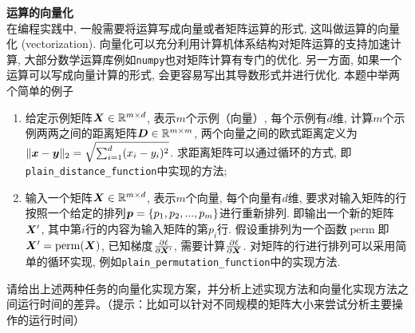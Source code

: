 \documentclass[answers]{exam}  %
\begin{document}
\begin{questions}
\question [20] \textbf{运算的向量化} \\
在编程实践中, 一般需要将运算写成向量或者矩阵运算的形式, 这叫做运算的向量化 (vectorization).
向量化可以充分利用计算机体系结构对矩阵运算的支持加速计算,
大部分数学运算库例如\lstinline{numpy}也对矩阵计算有专门的优化.
另一方面, 如果一个运算可以写成向量计算的形式, 会更容易写出其导数形式并进行优化.
本题中举两个简单的例子
\begin{enumerate}
    \item 给定示例矩阵$\boldsymbol{X} \in \mathbb{R}^{m\times d}$, 表示$m$个示例（向量）, 每个示例有$d$维,
    计算$m$个示例两两之间的距离矩阵$\boldsymbol{D} \in \mathbb{R}^{m\times m}$,
    两个向量之间的欧式距离定义为$\|{\boldsymbol{x}} - \boldsymbol{y}\|_2=\sqrt{\sum_{i=1}^{d} (x_i - y_i)^2}$.
    求距离矩阵可以通过循环的方式, 即\lstinline{plain_distance_function}中实现的方法;
    
    \item 输入一个矩阵$\boldsymbol{X} \in \mathbb{R}^{m\times d}$, 表示$m$个向量, 每个向量有$d$维,
    要求对输入矩阵的行按照一个给定的排列$\boldsymbol{p}=\{p_{1}, p_{2}, ..., p_m\}$进行重新排列.
    即输出一个新的矩阵$\boldsymbol{X}^\prime$, 其中第$i$行的内容为输入矩阵的第$p_{i}$行.
    假设重排列为一个函数$\operatorname{perm}$即$\boldsymbol{X}^\prime = \operatorname{perm}(\boldsymbol{X})$, 已知梯度$\frac{\partial \ell}{\partial \boldsymbol{X}^\prime}$,
    需要计算$\frac{\partial \ell}{\partial \boldsymbol{X}}$. 对矩阵的行进行排列可以采用简单的循环实现, 例如\lstinline{plain_permutation_function}中的实现方法.
    
\end{enumerate}
请给出上述两种任务的向量化实现方案，并分析上述实现方法和向量化实现方法之间运行时间的差异。（提示：比如可以针对不同规模的矩阵大小来尝试分析主要操作的运行时间）


\end{questions}
\end{document}
